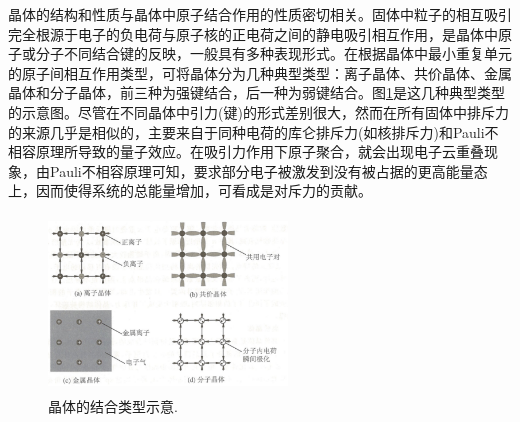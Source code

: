 晶体的结构和性质与晶体中原子结合作用的性质密切相关。固体中粒子的相互吸引完全根源于电子的负电荷与原子核的正电荷之间的静电吸引相互作用，是晶体中原子或分子不同结合键的反映，一般具有多种表现形式。在根据晶体中最小重复单元的原子间相互作用类型，可将晶体分为几种典型类型：离子晶体、共价晶体、金属晶体和分子晶体，前三种为强键结合，后一种为弱键结合。图\ref{Fig:SSI-05}是这几种典型类型的示意图。尽管在不同晶体中引力(键)的形式差别很大，然而在所有固体中排斥力的来源几乎是相似的，主要来自于同种电荷的库仑排斥力(如核排斥力)和Pauli不相容原理所导致的量子效应。在吸引力作用下原子聚合，就会出现电子云重叠现象，由Pauli不相容原理可知，要求部分电子被激发到没有被占据的更高能量态上，因而使得系统的总能量增加，可看成是对斥力的贡献。
\begin{figure}[h!]
\centering
\vspace*{-0.1in}
\includegraphics[height=1.85in,width=2.5in,viewport=0 0 90 70,clip]{Figures/Four_Crystal-type.png}
\caption{\small \textrm{晶体的结合类型示意.}}%
\label{Fig:SSI-05}
\end{figure}

